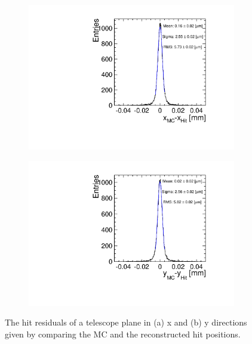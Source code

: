 \begin{figure}[htbp] \centering
  \begin{subfigure}[b]{0.45\textwidth}
    \includegraphics[width=\textwidth]{figures/Telescope/telescopePlane0_MC_vs_hit_x.pdf}
    \caption{}
  \end{subfigure}\hfill
  \begin{subfigure}[b]{0.45\textwidth}
    \includegraphics[width=\textwidth]{figures/Telescope/telescopePlane0_MC_vs_hit_y.pdf}
    \caption{}
  \end{subfigure}
  \caption{The hit residuals of a telescope plane in (a) x and (b) y
    directions given by comparing the MC and the reconstructed hit
    positions.}
  \label{fig:TelPlane0_MC_hit}
\end{figure}

